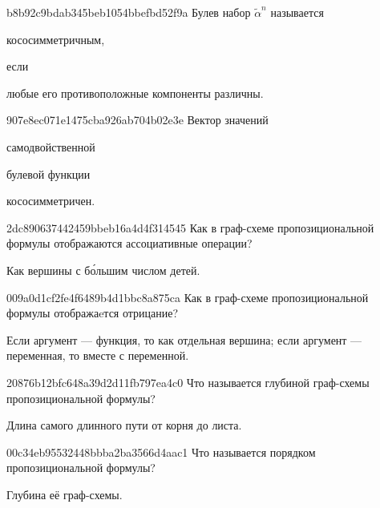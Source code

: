 \begin{note}{b8b92c9bdab345beb1054bbefbd52f9a}
    Булев набор \({ \widetilde \alpha^{n} }\) называется \begin{icloze}{2}кососимметричным,\end{icloze} если \begin{icloze}{1}любые его противоположные компоненты различны.\end{icloze}
\end{note}

\begin{note}{907e8ec071e1475cba926ab704b02e3e}
    Вектор значений \begin{icloze}{2}самодвойственной\end{icloze} булевой функции \begin{icloze}{1}кососимметричен.\end{icloze}
\end{note}

\begin{note}{2dc890637442459bbeb16a4d4f314545}
    Как в граф-схеме пропозициональной формулы отображаются ассоциативные операции?

    \begin{cloze}{1}
        Как вершины с б\'{о}льшим числом детей.
    \end{cloze}
\end{note}

\begin{note}{009a0d1cf2fe4f6489b4d1bbc8a875ca}
    Как в граф-схеме пропозициональной формулы отображаeтся отрицание?

    \begin{cloze}{1}
        Если аргумент --- функция, то как отдельная вершина; если аргумент --- переменная, то вместе с переменной.
    \end{cloze}
\end{note}

\begin{note}{20876b12bfc648a39d2d11fb797ea4c0}
   Что называется глубиной граф-схемы пропозициональной формулы?

   \begin{cloze}{1}
        Длина самого длинного пути от корня до листа.
   \end{cloze}
\end{note}

\begin{note}{00c34eb95532448bbba2ba3566d4aac1}
    Что называется порядком пропозициональной формулы?

    \begin{cloze}{1}
        Глубина её граф-схемы.
    \end{cloze}
\end{note}

